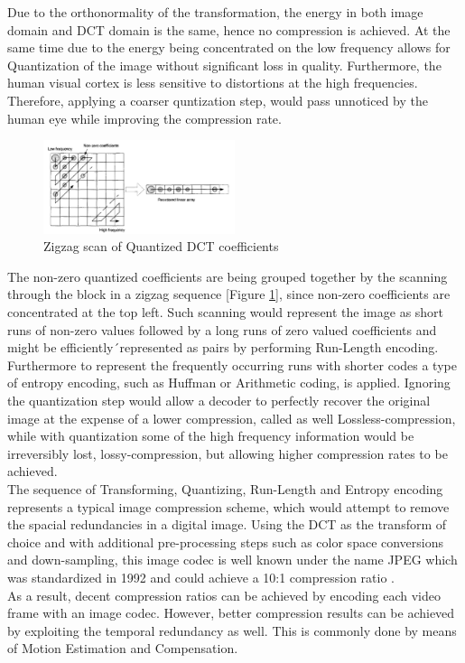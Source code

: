 \documentclass[a4paper,11pt,oneside]{article}
\begin{document}
\indent Due to the orthonormality of the transformation, the energy in both image domain and DCT domain is the same, hence no compression is achieved. At the same time due to the energy being concentrated on the low frequency allows for Quantization of the image without significant loss in quality. Furthermore, the human visual cortex is less sensitive to distortions at the high frequencies. Therefore, applying a coarser quntization step, would pass unnoticed by the human eye while improving the compression rate. \\
\begin{figure}
    \includegraphics[width=0.5\textwidth]{../figures/zigzag_reorder_QDCT.pdf}
    \caption{Zigzag scan of Quantized DCT coefficients}
    \label{figure:zigzag_scan}
\end{figure}
The non-zero quantized coefficients are being grouped together by the scanning through the block in a zigzag sequence [Figure \ref{figure:zigzag_scan}], since non-zero coefficients are concentrated at the top left. Such scanning would represent the image as short runs of non-zero values followed by a long runs of zero valued coefficients and might be efficiently´represented as pairs by performing Run-Length encoding. Furthermore to represent the frequently occurring runs with shorter codes a type of entropy encoding, such as Huffman or Arithmetic coding, is applied. Ignoring the quantization step would allow a decoder to perfectly recover the original image at the expense of a lower compression, called as well Lossless-compression, while with quantization some of the high frequency information would be irreversibly lost, lossy-compression, but allowing higher compression rates to be achieved. \\ 
\indent The sequence of Transforming, Quantizing, Run-Length and Entropy encoding represents a typical image compression scheme, which would attempt to remove the spacial redundancies in a digital image. Using the DCT as the transform of choice and with additional pre-processing steps such as color space conversions and down-sampling, this image codec is well known under the name JPEG which was standardized in 1992 and could achieve a 10:1 compression ratio \cite{jpeg_nasa}. \\
\indent As a result, decent compression ratios can be achieved by encoding each video frame with an image codec. However, better compression results can be achieved by exploiting the temporal redundancy as well. This is commonly done by means of Motion Estimation and Compensation. 
\end{document}
